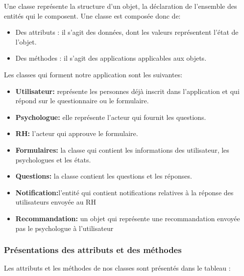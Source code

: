\documentclass[12]{article}
\begin{document}
Une classe représente la structure d'un objet, la déclaration de l'ensemble des entités qui le composent. Une classe est composée donc de:\\

\begin{itemize}
\item Des attributs : il s'agit des données, dont les valeurs représentent l'état de l'objet.
\item Des méthodes : il s'agit des applications applicables aux objets.
\end{itemize}

Les classes qui forment notre application sont les suivantes:

\begin{itemize}
\item \textbf{Utilisateur:} représente les personnes déjà inscrit dans l'application et qui répond sur le questionnaire ou le formulaire.
\item \textbf{Psychologue:} elle représente l'acteur qui fournit les questions.

\item \textbf{RH:} l'acteur qui approuve  le formulaire.

\item \textbf{Formulaires:} la classe qui contient les informations des utilisateur, les psychologues et les états.

\item \textbf{Questions:} la classe contient les questions et les réponses.

\item \textbf{Notification:}l'entité qui  contient notifications relatives à la réponse des utilisateurs envoyée 
au RH
\item   \textbf{Recommandation:} un objet qui représente une recommandation envoyée pas le psychologue à l'utilisateur
\end{itemize}

\subsubsection{Présentations des attributs et des méthodes}

Les attributs et les méthodes de nos classes sont présentés dans le tableau :
\end{document}

